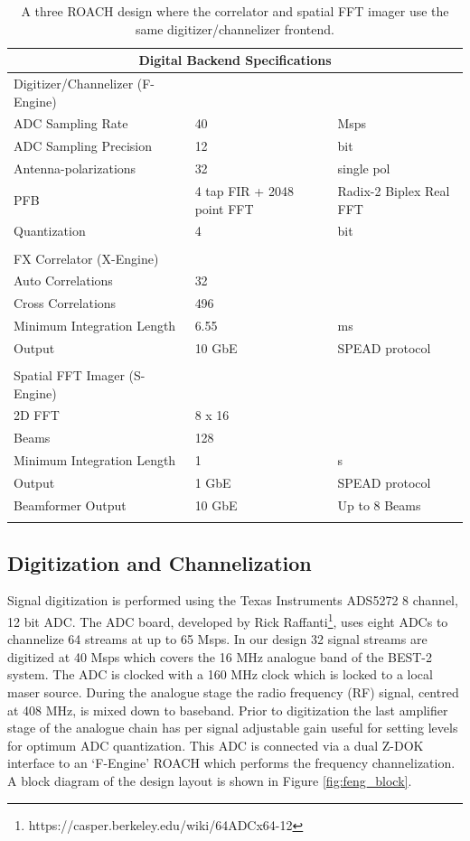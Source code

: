 \documentclass[useAMS,macros,usenatbib]{mn2e}
\begin{document}
\begin{table}
\begin{center}
\begin{tabular}{| l | l | l |}
\hline
\multicolumn{3}{|c|}{Digital Backend Specifications}\\
\hline
Digitizer/Channelizer (F-Engine) & &\\
\hline
ADC Sampling Rate	& 40 			& Msps\\
ADC Sampling Precision	& 12 			& bit \\
Antenna-polarizations 	& 32 			& single pol \\
PFB 			& 4 tap FIR + 2048 point FFT	& Radix-2 Biplex Real FFT\\
Quantization 		& 4 			& bit\\
& & \\
\hline
FX Correlator (X-Engine) & &\\
\hline
Auto Correlations 	& 32 			& \\
Cross Correlations 	& 496 			& \\
Minimum Integration Length & 6.55 		& ms\\
Output 			& 10 GbE 		& SPEAD protocol\\
& & \\
\hline
Spatial FFT Imager (S-Engine) & &\\
\hline
2D FFT 			& 8 x 16 		& \\
Beams 			& 128 			& \\
Minimum Integration Length & 1 			& s\\
Output 			& 1 GbE 		& SPEAD protocol\\
Beamformer Output 	& 10 GbE 		& Up to 8 Beams\\
& & \\
\hline
\end{tabular}
\caption{A three ROACH design where the correlator and spatial FFT imager use the same digitizer/channelizer frontend.}
\label{tbl:digital_specs}
\end{center}
\end{table}

\subsection{Digitization and Channelization}
\label{channelization}

Signal digitization is performed using the Texas Instruments ADS5272 8 channel, 12 bit ADC.
The ADC board, developed by Rick Raffanti\footnote{https://casper.berkeley.edu/wiki/64ADCx64-12}, uses eight ADCs to channelize 64 streams at up to 65 Msps.
In our design 32 signal streams are digitized at 40 Msps which covers the 16 MHz analogue band of the BEST-2 system.
The ADC is clocked with a 160 MHz clock which is locked to a local maser source.
During the analogue stage the radio frequency (RF) signal, centred at 408 MHz, is mixed down to baseband.
Prior to digitization the last amplifier stage of the analogue chain has per signal adjustable gain useful for setting levels for optimum ADC quantization.
This ADC is connected via a dual Z-DOK interface to an `F-Engine' ROACH which performs the frequency channelization.
A block diagram of the design layout is shown in Figure \ref{fig:feng_block}.
\end{document}
